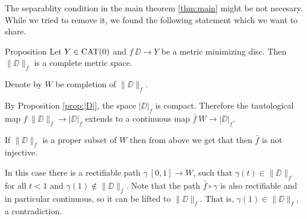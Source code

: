 \documentclass[a4paper,10pt]{amsart}
\begin{document}
The separablity condition in the main theorem \ref{thm:main}
might be not necesary.
While we tried to remove it, we found the following statement 
which we want to share.

\begin{thm}{Proposition}
Let $Y\in\mathop{\rm CAT}\nolimits(0)$ 
and 
$f\:\DD\to Y$ be a metric minimizing disc.
Then $\|\DD\|_f$ is a complete metric space.
\end{thm}

Denote by $W$ be completion of $\|\DD\|_f$.

By Proposition \ref{prop:|D|},
the space $|\DD|_f$ is compact.
Therefore the tautological map $f\:\|\DD\|_f\to |\DD|_f$ 
extends to a continuous map $\bar f\:W\to |\DD|_f$.

If $\|\DD\|_f$ is a proper subset of $W$ 
then from above we get that
then $\bar f$ is not injective.

In this case there is a rectifiable path $\gamma\:[0,1]\to W$,
such that $\gamma(t)\in\|\DD\|_f$ for all $t<1$ and $\gamma(1)\notin \|\DD\|_f$.
Note that the path $\bar f\circ \gamma$ is also rectifiable and in particular continuous, so it can be lifted to $\|\DD\|_f$.
That is, $\gamma(1)\in \|\DD\|_f$, a contradiction.
\qeds
\end{document}
